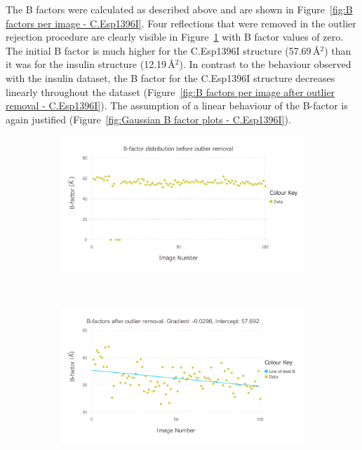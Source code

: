 The B factors were calculated as described above and are shown in Figure~\ref{fig:B factors per image - C.Esp1396I}.
Four reflections that were removed in the outlier rejection procedure are clearly visible in Figure~\ref{fig:B factors per image before outlier removal - C.Esp1396I} with B factor values of zero.
The initial B factor is much higher for the C.Esp1396I structure (57.69$\,$\AA$^2$) than it was for the insulin structure (12.19$\,$\AA$^2$).
In contrast to the behaviour observed with the insulin dataset, the B factor for the C.Esp1396I structure decreases linearly throughout the dataset (Figure~\ref{fig:B factors per image after outlier removal - C.Esp1396I}).
The assumption of a linear behaviour of the B-factor is again justified (Figure~\ref{fig:Gaussian B factor plots - C.Esp1396I}).
\begin{figure}
    \centering
    \begin{subfigure}[b]{1.0\textwidth}
            \centering
            \includegraphics[width=\textwidth]{figures/datared/BFac_Plot_Before_outlier_removal_cprot.pdf}
            \caption{}
            \label{fig:B factors per image before outlier removal - C.Esp1396I}
    \end{subfigure}
    \\
    \begin{subfigure}[b]{1.0\textwidth}
            \centering
            \includegraphics[width=\textwidth]{figures/datared/BFac_Plot_After_outlier_removal_cprot.pdf}

\end{subfigure}
\end{figure}
